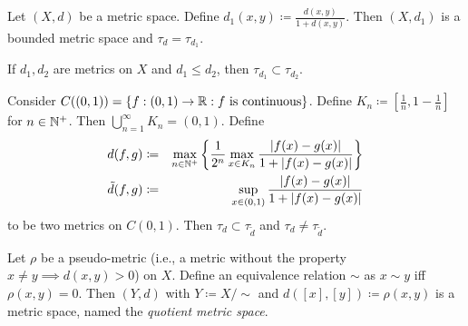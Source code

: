 \documentclass{techreport}
\begin{document}
\begin{proposition}
	Let $(X,d)$ be a metric space.
	Define $d_1(x,y) \coloneqq \frac{d(x,y)}{1 + d(x,y)}$.
	Then $(X,d_1)$ is a bounded metric space and $\tau_d = \tau_{d_1}$.
\end{proposition}

\begin{lemma}
	If $d_1,d_2$ are metrics on $X$ and $d_1 \le d_2$, then $\tau_{d_1} \subset \tau_{d_2}$.
\end{lemma}

\begin{remark}
	Consider $C((0,1)) = \{ f : (0,1) \to \mathbb{R} : f~\text{is continuous} \}$.
	Define $K_n \coloneqq [\frac{1}{n}, 1-\frac{1}{n}]$ for $n \in \mathbb{N}^+$.
	Then $\bigcup_{n=1}^\infty K_n = (0,1)$.
	Define
	\begin{eqnarray*}
		d(f,g) & \coloneqq & \max_{n \in \mathbb{N}^+} \left\{ \frac{1}{2^n} \max_{x \in K_n} \frac{|f(x)-g(x)|}{1+|f(x)-g(x)|} \right\} \\
		\tilde{d}(f,g) & \coloneqq & \sup_{x \in (0,1)} \frac{|f(x)-g(x)|}{1+|f(x)-g(x)|}
	\end{eqnarray*}
	to be two metrics on $C(0,1)$.
	Then $\tau_d \subset \tau_{\tilde{d}}$ and $\tau_d \neq \tau_{\tilde{d}}$.
\end{remark}

\begin{definition}
	Let $\rho$ be a pseudo-metric (i.e., a metric without the property $x \neq y \implies d(x,y) > 0$) on $X$.
	Define an equivalence relation ${\sim}$ as $x \sim y$ iff $\rho(x,y) = 0$.
	Then $(Y,d)$ with $Y \coloneqq X / {\sim}$ and $d([x],[y]) \coloneqq \rho(x,y)$ is a metric space, named the \emph{quotient metric space}.
\end{definition}


%
\end{document}
